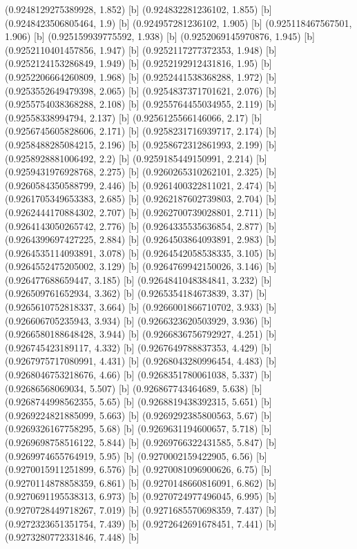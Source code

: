 {{{(0.9248129275389928, 1.852) [b] 
(0.924832281236102, 1.855) [b] 
(0.9248423506805464, 1.9) [b] 
(0.924957281236102, 1.905) [b] 
(0.925118467567501, 1.906) [b] 
(0.925159939775592, 1.938) [b] 
(0.9252069145970876, 1.945) [b] 
(0.9252110401457856, 1.947) [b] 
(0.9252117277372353, 1.948) [b] 
(0.9252124153286849, 1.949) [b] 
(0.9252192912431816, 1.95) [b] 
(0.9252206664260809, 1.968) [b] 
(0.9252441538368288, 1.972) [b] 
(0.9253552649479398, 2.065) [b] 
(0.9254837371701621, 2.076) [b] 
(0.9255754038368288, 2.108) [b] 
(0.9255764455034955, 2.119) [b] 
(0.92558338994794, 2.137) [b] 
(0.9256125566146066, 2.17) [b] 
(0.9256745605828606, 2.171) [b] 
(0.9258231716939717, 2.174) [b] 
(0.9258488285084215, 2.196) [b] 
(0.9258672312861993, 2.199) [b] 
(0.9258928881006492, 2.2) [b] 
(0.9259185449150991, 2.214) [b] 
(0.9259431976928768, 2.275) [b] 
(0.9260265310262101, 2.325) [b] 
(0.9260584350588799, 2.446) [b] 
(0.9261400322811021, 2.474) [b] 
(0.9261705349653383, 2.685) [b] 
(0.9262187602739803, 2.704) [b] 
(0.9262444170884302, 2.707) [b] 
(0.9262700739028801, 2.711) [b] 
(0.9264143050265742, 2.776) [b] 
(0.9264335535636854, 2.877) [b] 
(0.9264399697427225, 2.884) [b] 
(0.9264503864093891, 2.983) [b] 
(0.9264535114093891, 3.078) [b] 
(0.9264542058538335, 3.105) [b] 
(0.9264552475205002, 3.129) [b] 
(0.9264769942150026, 3.146) [b] 
(0.926477688659447, 3.185) [b] 
(0.9264841048384841, 3.232) [b] 
(0.926509761652934, 3.362) [b] 
(0.9265354184673839, 3.37) [b] 
(0.9265610752818337, 3.664) [b] 
(0.9266001866710702, 3.933) [b] 
(0.926606705235943, 3.934) [b] 
(0.9266323620503929, 3.936) [b] 
(0.9266580188648428, 3.944) [b] 
(0.9266836756792927, 4.251) [b] 
(0.926745423189117, 4.332) [b] 
(0.9267649788837353, 4.429) [b] 
(0.9267975717080991, 4.431) [b] 
(0.9268043280996454, 4.483) [b] 
(0.9268046753218676, 4.66) [b] 
(0.9268351780061038, 5.337) [b] 
(0.92686568069034, 5.507) [b] 
(0.926867743464689, 5.638) [b] 
(0.9268744998562355, 5.65) [b] 
(0.9268819438392315, 5.651) [b] 
(0.9269224821885099, 5.663) [b] 
(0.9269292385800563, 5.67) [b] 
(0.9269326167758295, 5.68) [b] 
(0.9269631194600657, 5.718) [b] 
(0.9269698758516122, 5.844) [b] 
(0.9269766322431585, 5.847) [b] 
(0.9269974655764919, 5.95) [b] 
(0.9270002159422905, 6.56) [b] 
(0.9270015911251899, 6.576) [b] 
(0.9270081096900626, 6.75) [b] 
(0.9270114878858359, 6.861) [b] 
(0.9270148660816091, 6.862) [b] 
(0.9270691195538313, 6.973) [b] 
(0.9270724977496045, 6.995) [b] 
(0.9270728449718267, 7.019) [b] 
(0.9271685570698359, 7.437) [b] 
(0.9272323651351754, 7.439) [b] 
(0.9272642691678451, 7.441) [b] 
(0.9273280772331846, 7.448) [b] 
}}}
